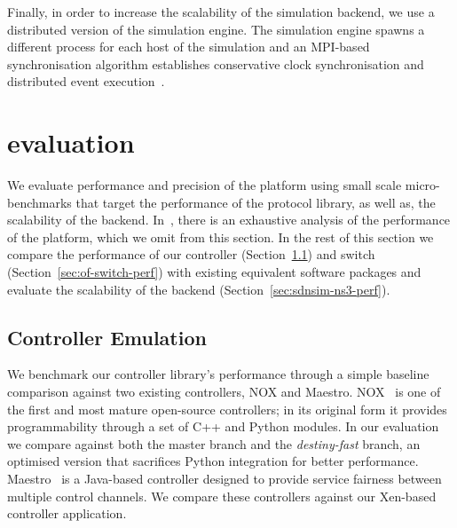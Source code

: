 Finally, in order to increase the scalability of the \sdnsim simulation backend, 
we use a distributed version of the  simulation engine. The simulation
engine spawns a different process for each host of the simulation and
an MPI-based synchronisation algorithm establishes conservative clock
synchronisation and distributed event execution~\cite{Pelkey:2011ua}. 

\section{\sdnsim evaluation} \label{sec:sdnsim-precision}

We evaluate performance and precision of the \sdnsim platform using small scale
micro-benchmarks that target the performance of the \of protocol library, as
well as, the scalability of the  backend.  In~\cite{madhavapeddy2013},
there is an exhaustive analysis of the performance of the \mirage platform,
which we omit from this section. In the rest of this section we compare the
performance of our \mirage \of controller (Section~\ref{sec:of-controller-perf}) and 
\mirage \of
switch (Section~\ref{sec:of-switch-perf}) with existing equivalent software
packages and evaluate the scalability of the  backend
(Section~\ref{sec:sdnsim-ns3-perf}).


\subsection{\mirage Controller Emulation} \label{sec:of-controller-perf}

We benchmark our controller library's performance through a simple baseline
comparison against two existing \of controllers, NOX and Maestro.
NOX~\cite{nox} is one of the first and most mature open-source \of controllers;
in its original form it provides programmability through a set of C++ and Python
modules.  In our evaluation we compare against both the master branch and the
{\it destiny-fast} branch, an optimised version that sacrifices Python
integration for better performance.  Maestro~\cite{cai2011} is a Java-based
controller designed to provide service fairness between multiple \of control
channels.  We compare these controllers against our Xen-based \mirage \of
controller application.


